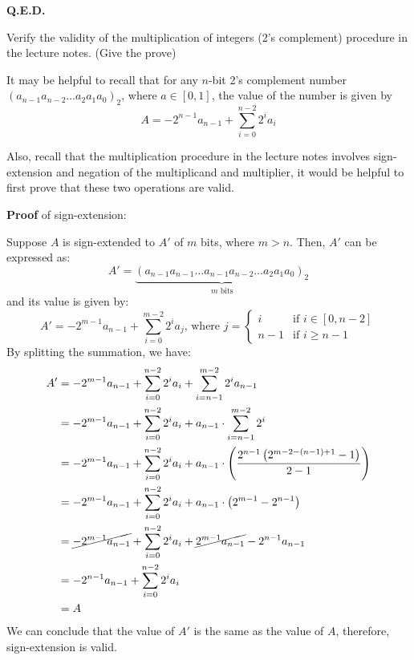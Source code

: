 \documentclass[answers]{exam}
\begin{document}
\begin{questions}
\begin{solution}
        \hfill \textbf{Q.E.D.}
    \end{solution}

    \question Verify the validity of the multiplication of integers (2's complement) procedure in the lecture notes.
    (Give the prove)

    \begin{solution}
        It may be helpful to recall that for any $n$-bit 2's complement number $\left(a_{n-1}a_{n-2}\dots a_2a_1a_0\right)_2$,
        where $a\in[0, 1]$, the value of the number is given by
        \begin{equation*}
            A=-2^{n-1}a_{n-1} + \sum_{i=0}^{n-2} 2^i a_i
        \end{equation*}

        Also, recall that the multiplication procedure in the lecture notes involves sign-extension and negation
        of the multiplicand and multiplier, it would be helpful to first prove that these two operations are valid.

        \textbf{Proof} of sign-extension:

        Suppose $A$ is sign-extended to $A'$ of $m$ bits, where $m>n$. Then, $A'$ can be expressed as:
        \[
            A' = \underbrace{\left(a_{n-1}a_{n-1}\dots a_{n-1}a_{n-2}\dots a_2a_1a_0\right)_2}_{m\text{ bits}}
        \]
        and its value is given by:
        \[
            A' = -2^{m-1}a_{n-1} + \sum_{i=0}^{m-2} 2^i a_j \text{, where }
            j = \begin{cases}
                i & \text{if } i \in [0, n-2] \\
                n-1 & \text{if } i \geq n-1
            \end{cases}
        \]
        By splitting the summation, we have:
        \begin{align*}
            A' &= -2^{m-1}a_{n-1} + \sum_{i=0}^{n-2} 2^i a_i + \sum_{i=n-1}^{m-2} 2^i a_{n-1} \\
            &= -2^{m-1}a_{n-1} + \sum_{i=0}^{n-2} 2^i a_i + a_{n-1} \cdot \sum_{i=n-1}^{m-2} 2^i \\
            &= -2^{m-1}a_{n-1} + \sum_{i=0}^{n-2} 2^i a_i + a_{n-1} \cdot \left(\frac{2^{n-1}\left(2^{m-2-(n-1)+1}-1\right)}{2-1}\right) \\
            &= -2^{m-1}a_{n-1} + \sum_{i=0}^{n-2} 2^i a_i + a_{n-1} \cdot \left(2^{m-1} - 2^{n-1}\right) \\
            &= \cancel{-2^{m-1}a_{n-1}} + \sum_{i=0}^{n-2} 2^i a_i + \cancel{2^{m-1} a_{n-1}} - 2^{n-1} a_{n-1} \\
            &= -2^{n-1} a_{n-1} + \sum_{i=0}^{n-2} 2^i a_i \\ &= A
        \end{align*}
        We can conclude that the value of $A'$ is the same as the value of $A$,
        therefore, sign-extension is valid.


\end{solution}
\end{questions}
\end{document}
